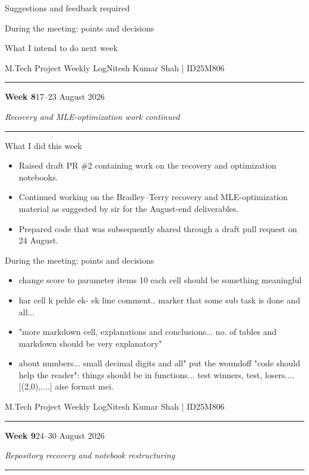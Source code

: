 \documentclass[10pt]{article}
\newcommand{\weekheading}[3]{%
  {\small M.Tech Project Weekly Log}\hfill{\small Nitesh Kumar Shah \;|\; ID25M806}\par
  \vspace{2pt}\hrule\vspace{7pt}
  {\Large\bfseries Week #1}\hfill{\normalsize #2}\par
  \vspace{2pt}
  {\itshape #3}\par
  \vspace{5pt}\hrule\vspace{7pt}
}
\newcommand{\blankentry}{\begin{center}\textemdash\end{center}}
\newcommand{\pastweekboxes}{%
  \begin{weeklybox}{Suggestions and feedback required}
    \blankentry
  \end{weeklybox}
  \begin{weeklybox}{During the meeting: points and decisions}
    \blankentry
  \end{weeklybox}
  \begin{weeklybox}{What I intend to do next week}
    \blankentry
  \end{weeklybox}
}
\begin{document}
\pastweekboxes


\newpage
\weekheading{8}{17--23 August 2026}{Recovery and MLE-optimization work continued}

\begin{weeklybox}{What I did this week}
  \begin{itemize}
    \item Raised draft PR \#2 containing work on the recovery and optimization notebooks.

    \item Continued working on the Bradley--Terry recovery and MLE-optimization material as suggested by sir for the August-end deliverables.
    \item Prepared code that was subsequently shared through a draft pull request on 24 August.
  \end{itemize}
\end{weeklybox}
\begin{weeklybox}{During the meeting: points and decisions}
  \small
  \begin{itemize}
    \item change score to parameter
items 10
each cell should be something meaningful

    \item har cell k pehle ek- ek line comment..
marker that some sub task is done and all... 

    \item "more markdown cell, explanations and conclusions... 
no. of tables and 
markdown should be very explanatory"

    \item about numbers... small decimal digits and all" put the woundoff
"code should help the reader": things should be in functions...
test winners, test, losers....
[(2,0),....] aise format mei.

  \end{itemize}
\end{weeklybox}



\newpage
\weekheading{9}{24--30 August 2026}{Repository recovery and notebook restructuring}
\end{document}
